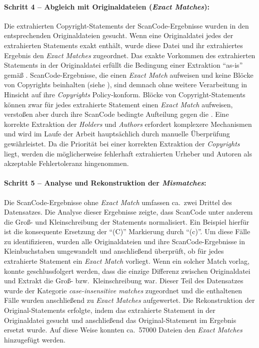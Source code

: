 \paragraph{Schritt 4 -- Abgleich mit Originaldateien (\textit{Exact Matches}):}
Die extrahierten Copyright-Statements der ScanCode-Ergebnisse wurden in den entsprechenden Originaldateien gesucht.
Wenn eine Originaldatei jedes der extrahierten Statements exakt enthält, wurde diese Datei und ihr extrahiertes Ergebnis den \textit{Exact Matches} zugeordnet.
Das exakte Vorkommen des extrahierten Statements in der Originaldatei erfüllt die Bedingung einer Extraktion \enquote{as-is} gemäß .
ScanCode-Ergebnisse, die einen \textit{Exact Match} aufweisen und keine Blöcke von Copyrights beinhalten (siehe ), sind demnach ohne weitere Verarbeitung in Hinsicht auf ihre \textit{Copyrights} Policy-konform.
Blöcke von Copyright-Statements können zwar für jedes extrahierte Statement einen \textit{Exact Match} aufweisen, verstoßen aber durch ihre ScanCode bedingte Aufteilung gegen die .
Eine korrekte Extraktion der \textit{Holders} und \textit{Authors} erfordert komplexere Mechanismen und wird im Laufe der Arbeit hauptsächlich durch manuelle Überprüfung gewährleistet.
Da die Priorität bei einer korrekten Extraktion der \textit{Copyrights} liegt, werden die möglicherweise fehlerhaft extrahierten Urheber und Autoren als akzeptable Fehlertoleranz hingenommen.

\paragraph{Schritt 5 -- Analyse und Rekonstruktion der \textit{Mismatches}:}
Die ScanCode-Ergebnisse ohne \textit{Exact Match} umfassen ca.\ zwei Drittel des Datensatzes.
Die Analyse dieser Ergebnisse zeigte, dass ScanCode unter anderem die Groß- und Kleinschreibung der Statements normalisiert.
Ein Beispiel hierfür ist die konsequente Ersetzung der \enquote{(C)} Markierung durch \enquote{(c)}.
Um diese Fälle zu identifizieren, wurden alle Originaldateien und ihre ScanCode-Ergebnisse in Kleinbuchstaben umgewandelt und anschließend überprüft, ob für jedes extrahierte Statement ein \textit{Exact Match} vorliegt.
Wenn ein solcher Match vorlag, konnte geschlussfolgert werden, dass die einzige Differenz zwischen Originaldatei und Extrakt die Groß- bzw.\ Kleinschreibung war.
Dieser Teil des Datensatzes wurde der Kategorie \textit{case-insensitive matches} zugeordnet und die enthaltenen Fälle wurden anschließend zu \textit{Exact Matches} aufgewertet.
Die Rekonstruktion der Original-Statements erfolgte, indem das extrahierte Statement in der Originaldatei gesucht und anschließend das Original-Statement im Ergebnis ersetzt wurde.
Auf diese Weise konnten ca.\ \num{57000} Dateien den \textit{Exact Matches} hinzugefügt werden.

